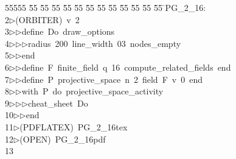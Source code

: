%
%
\begin{tabbing}
55555 \= 55 \= 55 \= 55 \= 55 \= 55 \= 55 \= 55 \= 55 \= 55 \= 55 \= 55 \= 55 \= \>PG\_2\_16:\\[0pt]
2\>$\triangleright$\>(ORBITER)\ v\ 2\ \\[0pt]
3\>$\triangleright$\>$\triangleright$\>define\ Do\ draw\_options\ \\[0pt]
4\>$\triangleright$\>$\triangleright$\>$\triangleright$\>radius\ 200\ line\_width\ 03\ nodes\_empty\ \\[0pt]
5\>$\triangleright$\>$\triangleright$\>end\ \\[0pt]
6\>$\triangleright$\>$\triangleright$\>define\ F\ finite\_field\ q\ 16\ compute\_related\_fields\ end\ \\[0pt]
7\>$\triangleright$\>$\triangleright$\>define\ P\ projective\_space\ n\ 2\ field\ F\ v\ 0\ end\ \\[0pt]
8\>$\triangleright$\>$\triangleright$\>with\ P\ do\ projective\_space\_activity\ \\[0pt]
9\>$\triangleright$\>$\triangleright$\>$\triangleright$\>cheat\_sheet\ Do\ \\[0pt]
10\>$\triangleright$\>$\triangleright$\>end\\[0pt]
11\>$\triangleright$\>(PDFLATEX)\ PG\_2\_16tex\ \\[0pt]
12\>$\triangleright$\>(OPEN)\ PG\_2\_16pdf\\[0pt]
13\>\end{tabbing}
